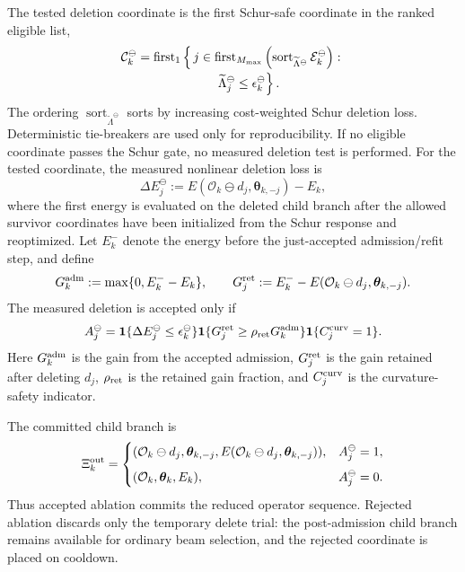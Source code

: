 \documentclass[
  reprint,
  amsmath,
  amssymb,
  aps,
  pra,
  nofootinbib,
  superscriptaddress,
  floatfix
]{revtex4-2}
\begin{document}
The tested deletion coordinate is the first Schur-safe coordinate in the ranked
eligible list,
\begin{equation}
\begin{aligned}
\mathcal C_k^\ominus
&=
\operatorname{first}_{1}
\left\{
\,j\in
\operatorname{first}_{M_{\max}}
\left(
\operatorname{sort}_{\widetilde\Lambda^\ominus}
\mathcal E_k^\ominus
\right)
:
{}\right.
\\[-0.3ex]
&\hspace{6.2em}
\left.
\widetilde\Lambda_j^\ominus
\le
\epsilon_k^\ominus
\right\}.
\end{aligned}
\label{eq:ablation_first_passing_rung}
\end{equation}
The ordering \(\operatorname{sort}_{\widetilde\Lambda^\ominus}\) sorts by
increasing cost-weighted Schur deletion loss.  Deterministic tie-breakers are
used only for reproducibility.  If no eligible coordinate passes the Schur gate,
no measured deletion test is performed.  For the tested coordinate, the measured
nonlinear deletion loss is
\begin{equation}
\Delta E_j^\ominus
:=
E(\mathcal O_k\ominus d_j,\boldsymbol\theta_{k,-j})-E_k,
\label{eq:ablation_refit_loss}
\end{equation}
where the first energy is evaluated on the deleted child branch after the
allowed survivor coordinates have been initialized from the Schur response and
reoptimized.  Let \(E_k^-\) denote the energy before the just-accepted
admission/refit step, and define
\[
G_k^{\rm adm}:=\max\{0,E_k^- - E_k\},
\qquad
G_j^{\rm ret}:=
E_k^- - E(\mathcal O_k\ominus d_j,\boldsymbol\theta_{k,-j}).
\]
The measured deletion is accepted only if
\begin{equation}
A_j^\ominus
=
\mathbf 1\{\Delta E_j^\ominus\le\epsilon_k^\ominus\}
\mathbf 1\{G_j^{\rm ret}\ge\rho_{\rm ret}G_k^{\rm adm}\}
\mathbf 1\{C_j^{\rm curv}=1\}.
\label{eq:ablation_admissible_set}
\end{equation}
Here \(G_k^{\rm adm}\) is the gain from the accepted admission, \(G_j^{\rm ret}\)
is the gain retained after deleting \(d_j\), \(\rho_{\rm ret}\) is the retained
gain fraction, and \(C_j^{\rm curv}\) is the curvature-safety indicator.

The committed child branch is
\[
\Xi_k^{\rm out}
=
\begin{cases}
(\mathcal O_k\ominus d_j,\boldsymbol\theta_{k,-j},
E(\mathcal O_k\ominus d_j,\boldsymbol\theta_{k,-j})),
& A_j^\ominus=1,\\[2mm]
(\mathcal O_k,\boldsymbol\theta_k,E_k),
& A_j^\ominus=0 .
\end{cases}
\]
Thus accepted ablation commits the reduced operator sequence.  Rejected
ablation discards only the temporary delete trial: the post-admission child
branch remains available for ordinary beam selection, and the rejected
coordinate is placed on cooldown.
\end{document}
